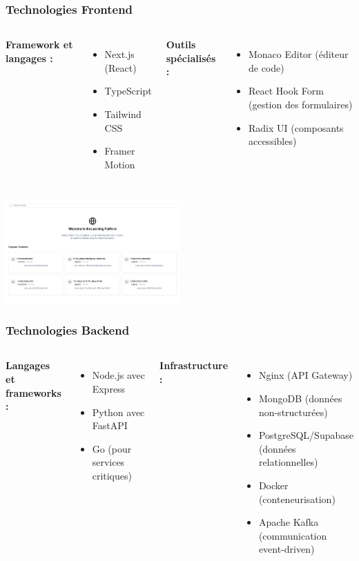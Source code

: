 \documentclass{beamer}
\begin{document}
\begin{frame}
\frametitle{Technologies Frontend}
\begin{columns}
\textbf{Framework et langages :}
\begin{itemize}
    \item Next.js (React)
    \item TypeScript
    \item Tailwind CSS
    \item Framer Motion
\end{itemize}

\textbf{Outils spécialisés :}
\begin{itemize}
    \item Monaco Editor (éditeur de code)
    \item React Hook Form (gestion des formulaires)
    \item Radix UI (composants accessibles)
\end{itemize}
\end{columns}
\begin{center}
    \includegraphics[width=0.5\textwidth]{week_3_img/accueil.png}
\end{center}
\end{frame}

\begin{frame}
\frametitle{Technologies Backend}
\begin{columns}
\textbf{Langages et frameworks :}
\begin{itemize}
    \item Node.js avec Express
    \item Python avec FastAPI
    \item Go (pour services critiques)
\end{itemize}

\textbf{Infrastructure :}
\begin{itemize}
    \item Nginx (API Gateway)
    \item MongoDB (données non-structurées)
    \item PostgreSQL/Supabase (données relationnelles)
    \item Docker (conteneurisation)
    \item Apache Kafka (communication event-driven)
\end{itemize}
\end{columns}
\end{frame}
\end{document}
